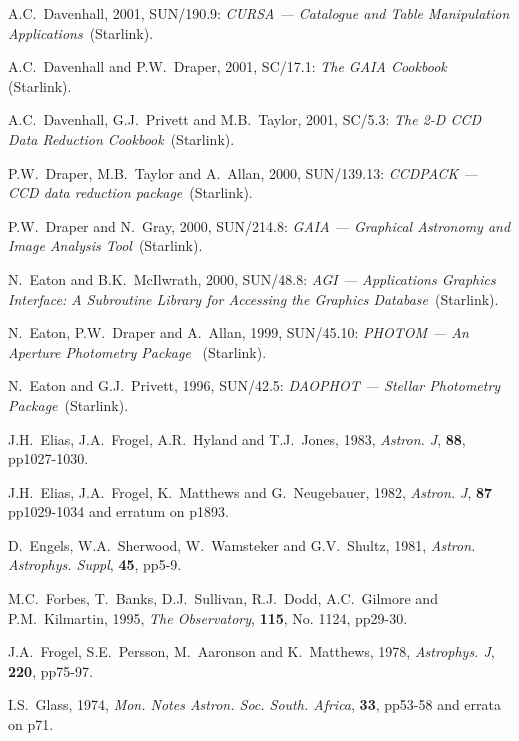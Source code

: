 \documentclass[twoside,11pt]{article}
\newcommand{\xref}[3]{#1}
\begin{document}
\begin{thebibliography}{99}
   A.C.~Davenhall, 2001, \xref{SUN/190.9}{sun190}{}:
   {\it CURSA --- Catalogue and Table Manipulation Applications}\,
   (Starlink).

   A.C.~Davenhall and P.W.~Draper, 2001,
   \xref{SC/17.1}{sc17}{}: {\it The GAIA Cookbook}\, (Starlink).

   A.C.~Davenhall, G.J.~Privett and M.B.~Taylor, 2001,
   \xref{SC/5.3}{sc5}{}: {\it The 2-D CCD Data Reduction Cookbook}\,
   (Starlink).

   P.W.~Draper, M.B.~Taylor and A.~Allan, 2000,
   \xref{SUN/139.13}{sun139}{}: {\it CCDPACK --- CCD data reduction package}\,
   (Starlink).

   P.W.~Draper and N.~Gray, 2000,
   \xref{SUN/214.8}{sun214}{}: {\it GAIA --- Graphical Astronomy and Image
   Analysis Tool}\, (Starlink).

   N.~Eaton and B.K.~McIlwrath, 2000,
   \xref{SUN/48.8}{sun48}{}: {\it AGI --- Applications Graphics Interface:
   A Subroutine Library for Accessing the Graphics Database}\, (Starlink).

   N.~Eaton, P.W.~Draper and A.~Allan, 1999,
   \xref{SUN/45.10}{sun45}{}: {\it PHOTOM --- An Aperture Photometry
   Package }\, (Starlink).

   N.~Eaton and G.J.~Privett, 1996, \xref{SUN/42.5}{sun42}{}:
   {\it DAOPHOT --- Stellar Photometry Package}\, (Starlink).

   J.H.~Elias, J.A.~Frogel, A.R.~Hyland and T.J.~Jones,
   1983, {\it Astron. J}, {\bf 88}, pp1027-1030.

   J.H.~Elias, J.A.~Frogel, K.~Matthews and G.~Neugebauer,
   1982, {\it Astron. J}, {\bf 87} pp1029-1034 and erratum on p1893.

   D.~Engels, W.A.~Sherwood, W.~Wamsteker and
   G.V.~Shultz, 1981, {\it Astron. Astrophys. Suppl}, {\bf 45}, pp5-9.

   M.C.~Forbes, T.~Banks, D.J.~Sullivan, R.J.~Dodd,
   A.C.~Gilmore and P.M.~Kilmartin, 1995, {\it The Observatory},
   {\bf 115}, No. 1124, pp29-30.

   J.A.~Frogel, S.E.~Persson, M.~Aaronson and
   K.~Matthews, 1978, {\it Astrophys. J}, {\bf 220}, pp75-97.

   I.S.~Glass, 1974, {\it Mon. Notes Astron. Soc.
   South. Africa}, {\bf 33}, pp53-58 and errata on p71.


\end{thebibliography}
\end{document}
